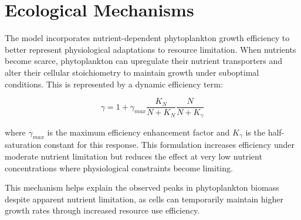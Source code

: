 \section{Ecological Mechanisms}

The model incorporates nutrient-dependent phytoplankton growth efficiency to better represent physiological adaptations to resource limitation. When nutrients become scarce, phytoplankton can upregulate their nutrient transporters and alter their cellular stoichiometry to maintain growth under suboptimal conditions. This is represented by a dynamic efficiency term:

\[ \gamma = 1 + \gamma_{max} \frac{K_N}{N + K_N} \frac{N}{N + K_\gamma} \]

where $\gamma_{max}$ is the maximum efficiency enhancement factor and $K_\gamma$ is the half-saturation constant for this response. This formulation increases efficiency under moderate nutrient limitation but reduces the effect at very low nutrient concentrations where physiological constraints become limiting.

This mechanism helps explain the observed peaks in phytoplankton biomass despite apparent nutrient limitation, as cells can temporarily maintain higher growth rates through increased resource use efficiency.
